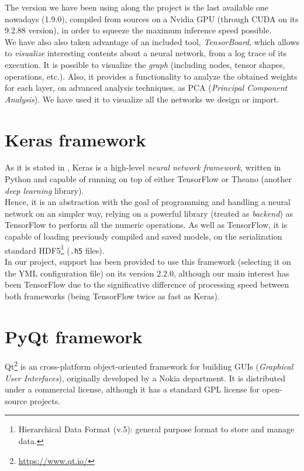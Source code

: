 	The version we have been using along the project is the last available one nowadays (1.9.0), compiled from sources on a Nvidia GPU (through CUDA on its 9.2.88 version), in order to squeeze the maximum inference speed possible.\\
	
	We have also also taken advantage of an included tool, \emph{TensorBoard}, which allows to \emph{visualize} interesting contents about a neural network, from a log trace of its execution. It is possible to visualize the \emph{graph} (including nodes, tensor shapes, operations, etc.). Also, it provides a functionality to analyze the obtained weights for each layer, on advanced analysis techniques, as PCA (\emph{Principal Component Analysis}). We have used it to visualize all the networks we design or import.




\section{Keras framework}
	As it is stated in \cite{dpascualhe}, Keras is a high-level \emph{neural network framework}, written in Python and capable of running on top of either TensorFlow or Theano (another \emph{deep learning} library).\\
	
	Hence, it is an abstraction with the goal of programming and handling a neural network on an simpler way, relying on a powerful library (treated as \emph{backend}) as TensorFlow to perform all the numeric operations. As well as TensorFlow, it is capable of loading previously compiled and saved models, on the serialization standard HDF5\footnote{Hierarchical Data Format (v.5): general purpose format to store and manage data.} (\texttt{.h5} files).\\
	
	In our project, support has been provided to use this framework (selecting it on the YML configuration file) on its version 2.2.0, although our main interest has been TensorFlow due to the significative difference of processing speed between both frameworks (being TensorFlow twice as fast as Keras).
\section{PyQt framework}
	Qt\footnote{\url{https://www.qt.io/}} is an cross-platform object-oriented framework for building GUIs (\emph{Graphical User Interfaces}), originally developed by a Nokia department. It is distributed under a commercial license, although it has a standard GPL license for open-source projects.\\
	
